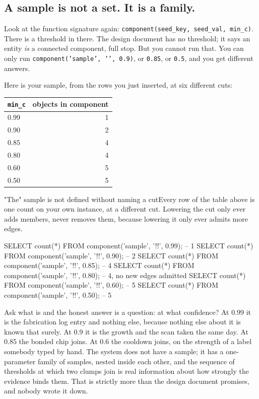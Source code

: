 \subsection{A sample is not a set. It is a family.}

Look at the function signature again: \texttt{component(seed\_key, seed\_val, min\_c)}. There is a threshold in there. The design document has no threshold; it says an entity \emph{is} a connected component, full stop. But you cannot run that. You can only run \texttt{component('sample', '\labSample', 0.9)}, or \texttt{0.85}, or \texttt{0.5}, and you get different answers.

Here is your sample, from the rows you just inserted, at six different cuts:

\begin{center}
\begin{tabular}{lr}
\toprule
\texttt{min\_c} & objects in component \\
\midrule
0.99 & 1 \\
0.90 & 2 \\
0.85 & 4 \\
0.80 & 4 \\
0.60 & 5 \\
0.50 & 5 \\
\bottomrule
\end{tabular}
\end{center}

\begin{Correspondence}{"The" sample is not defined without naming a cut}{Every row of the table above is one count on your own instance, at a different cut.}
Lowering the cut only ever adds members, never removes them, because lowering it only ever admits more edges.
\begin{Check}
SELECT count(*) FROM component('sample', '!\labSample!', 0.99);   -- 1
SELECT count(*) FROM component('sample', '!\labSample!', 0.90);   -- 2
SELECT count(*) FROM component('sample', '!\labSample!', 0.85);   -- 4
SELECT count(*) FROM component('sample', '!\labSample!', 0.80);   -- 4, no new edges admitted
SELECT count(*) FROM component('sample', '!\labSample!', 0.60);   -- 5
SELECT count(*) FROM component('sample', '!\labSample!', 0.50);   -- 5
\end{Check}
Ask what \labSample{} is and the honest answer is a question: at what confidence? At 0.99 it is the fabrication log entry and nothing else, because nothing else about it is known that surely. At 0.9 it is the growth and the scan taken the same day. At 0.85 the bonded chip joins. At 0.6 the cooldown joins, on the strength of a label somebody typed by hand. The system does not have a sample; it has a one-parameter family of samples, nested inside each other, and the sequence of thresholds at which two clumps join is real information about how strongly the evidence binds them. That is strictly more than the design document promises, and nobody wrote it down.
\end{Correspondence}

